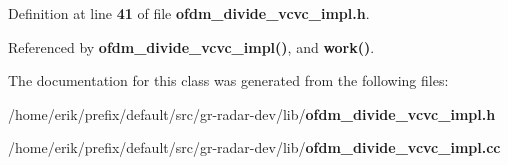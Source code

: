 Definition at line {\bf 41} of file {\bf ofdm\+\_\+divide\+\_\+vcvc\+\_\+impl.\+h}.



Referenced by {\bf ofdm\+\_\+divide\+\_\+vcvc\+\_\+impl()}, and {\bf work()}.



The documentation for this class was generated from the following files\+:\begin{DoxyCompactItemize}
\item 
/home/erik/prefix/default/src/gr-\/radar-\/dev/lib/{\bf ofdm\+\_\+divide\+\_\+vcvc\+\_\+impl.\+h}\item 
/home/erik/prefix/default/src/gr-\/radar-\/dev/lib/{\bf ofdm\+\_\+divide\+\_\+vcvc\+\_\+impl.\+cc}\end{DoxyCompactItemize}
